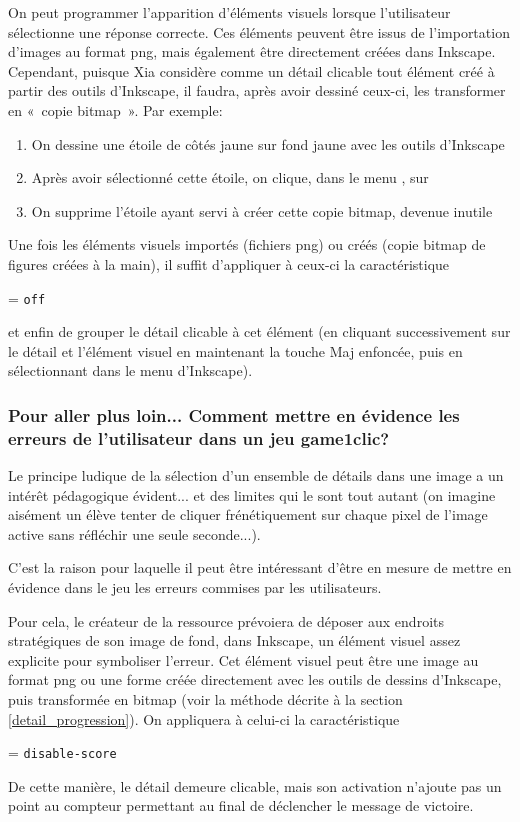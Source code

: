 {On peut programmer l'apparition d'éléments visuels lorsque l'utilisateur sélectionne une réponse correcte. 
Ces éléments peuvent être issus de l'importation d'images au format png, mais également 
être directement créées dans Inkscape.
Cependant, puisque Xia considère comme un détail clicable tout élément créé à partir des outils 
d'Inkscape, il faudra, après avoir dessiné ceux-ci, les transformer en «~copie bitmap~».
Par exemple:
\begin{enumerate}
 \item On dessine une étoile de côtés jaune sur fond jaune avec les outils d'Inkscape
 \item Après avoir sélectionné cette étoile, on clique, dans le menu , sur 
 \item On supprime l'étoile ayant servi à créer cette copie bitmap, devenue inutile
\end{enumerate}

Une fois les éléments visuels importés (fichiers png) ou créés (copie bitmap de figures créées à la main),
il suffit d'appliquer à ceux-ci la caractéristique
\begin{center}
 = \verb|off|
\end{center}
et enfin de grouper le détail clicable à cet élément (en cliquant successivement sur le détail et l'élément visuel en maintenant 
la touche Maj enfoncée, puis en sélectionnant  dans le menu  d'Inkscape).

\subsubsection{Pour aller plus loin... Comment mettre en évidence les erreurs de l'utilisateur dans un jeu game1clic?}

Le principe ludique de la sélection d'un ensemble de détails dans une image a un intérêt pédagogique évident... 
et des limites qui le sont tout autant (on imagine aisément un élève tenter de cliquer frénétiquement sur chaque pixel 
de l'image active sans réfléchir une seule seconde...).

C'est la raison pour laquelle il peut être intéressant d'être en mesure de mettre en évidence dans le jeu les erreurs commises 
par les utilisateurs.

Pour cela, le créateur de la ressource prévoiera de déposer aux endroits stratégiques de son image de fond, dans Inkscape, 
un élément visuel assez explicite pour symboliser l'erreur. Cet élément visuel peut être une 
image au format png ou une forme créée directement avec les outils de dessins d'Inkscape, puis transformée en bitmap 
(voir la méthode décrite à la section \ref{detail_progression}). 
On appliquera à celui-ci la caractéristique
\begin{center}
 = \verb|disable-score| 
\end{center}
De cette manière, le détail demeure
clicable, mais son activation n'ajoute pas un point au compteur permettant au final de déclencher 
le message de victoire.

}
